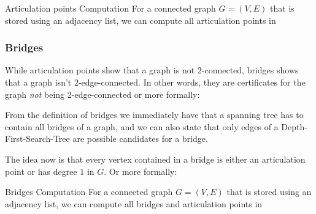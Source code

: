 \begin{theorem}[]{Articulation points Computation}
    For a connected graph $G = (V, E)$ that is stored using an adjacency list, we can compute all articulation points in 
\end{theorem}


\newpage
\subsubsection{Bridges}
While articulation points show that a graph is not $2$-connected, bridges shows that a graph isn't $2$-edge-connected.
In other words, they are certificates for the graph \textit{not} being $2$-edge-connected or more formally:

\begin{center}
\end{center}

From the definition of bridges we immediately have that a spanning tree has to contain all bridges of a graph, and we can also state that only edges of a Depth-First-Search-Tree are possible candidates for a bridge.

The idea now is that every vertex contained in a bridge is either an articulation point or has degree $1$ in $G$. Or more formally:

\begin{center}
\end{center}

\begin{theorem}[]{Bridges Computation}
    For a connected graph $G = (V, E)$ that is stored using an adjacency list, we can compute all bridges and articulation points in 
\end{theorem}

